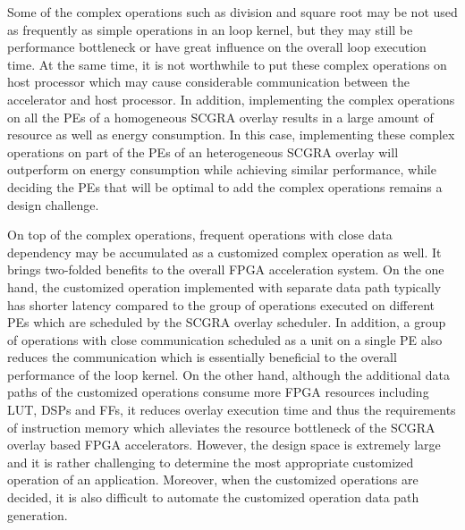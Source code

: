 Some of the complex operations such as division and square root may be not used as frequently as simple operations in an loop kernel, but they may still be performance bottleneck or have great influence on the overall loop execution time. At the same time, it is not worthwhile to put these complex operations on host processor which may cause considerable communication between the accelerator and host processor. In addition, implementing the complex operations on all the PEs of a homogeneous SCGRA overlay results in a large amount of resource as well as energy consumption. In this case, implementing these complex operations on part of the PEs of an heterogeneous SCGRA overlay will outperform on energy consumption while achieving similar performance, while deciding the PEs that will be optimal to add the complex operations remains a design challenge.

On top of the complex operations, frequent operations with close data dependency may be accumulated as a customized complex operation as well. It brings two-folded benefits to the overall FPGA acceleration system. On the one hand, the customized operation implemented with separate data path typically has shorter latency compared to the group of operations executed on different PEs which are scheduled by the SCGRA overlay scheduler. In addition, a group of operations with close communication scheduled as a unit on a single PE also reduces the communication which is essentially beneficial to the overall performance of the loop kernel. On the other hand, although the additional data paths of the customized operations consume more FPGA resources including LUT, DSPs and FFs, it reduces overlay execution time and thus the requirements of instruction memory which alleviates the resource bottleneck of the SCGRA overlay based FPGA accelerators. However, the design space is extremely large and it is rather challenging to determine the most appropriate customized operation of an application. Moreover, when the customized operations are decided, it is also difficult to automate the customized operation data path generation.

